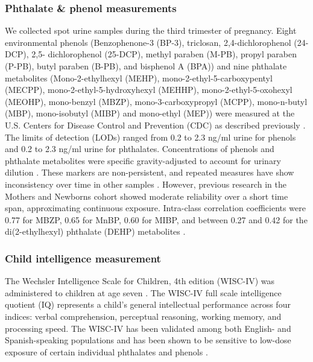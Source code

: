 \subsubsection{Phthalate \& phenol measurements}
We collected spot urine samples during the third trimester of pregnancy. Eight environmental phenols (Benzophenone-3 (BP-3), triclosan, 2,4-dichlorophenol (24-DCP), 2,5- dichlorophenol (25-DCP), methyl paraben (M-PB), propyl paraben (P-PB), butyl paraben (B-PB), and bisphenol A (BPA)) and nine phthalate metabolites (Mono-2-ethylhexyl (MEHP), mono-2-ethyl-5-carboxypentyl (MECPP), mono-2-ethyl-5-hydroxyhexyl (MEHHP), mono-2-ethyl-5-oxohexyl (MEOHP), mono-benzyl (MBZP), mono-3-carboxypropyl (MCPP), mono-n-butyl (MBP), mono-isobutyl (MIBP) and mono-ethyl (MEP)) were measured at the U.S. Centers for Disease Control and Prevention (CDC) as described previously \citep{ye2005automated, calafat2008exposure, silva2004urinary}. The limits of detection (LODs) ranged from 0.2 to 2.3 ng/ml urine for phenols and 0.2 to 2.3 ng/ml urine for phthalates. Concentrations of phenols and phthalate metabolites were specific gravity-adjusted to account for urinary dilution \citep{hauser2004temporal}. These markers are non-persistent, and repeated measures have show inconsistency over time in other samples \citep{fisher2015bisphenol}. However, previous research in the Mothers and Newborns cohort showed moderate reliability over a short time span, approximating continuous exposure. Intra-class correlation coefficients were 0.77 for MBZP, 0.65 for MnBP, 0.60 for MIBP, and between 0.27 and 0.42 for the di(2-ethylhexyl) phthalate (DEHP) metabolites \citep{whyatt2012maternal, factor2014persistent}.

\subsubsection{Child intelligence measurement}
The Wechsler Intelligence Scale for Children, 4th edition (WISC-IV) was administered to children at age seven \citep{wechsler2003wechsler}. The WISC-IV full scale intelligence quotient (IQ) represents a child's general intellectual performance across four indices: verbal comprehension, perceptual reasoning, working memory, and processing speed. The WISC-IV has been validated among both English- and Spanish-speaking populations and has been shown to be sensitive to low-dose exposure of certain individual phthalates and phenols \citep{factor2014persistent, guo2020prenatal}.


